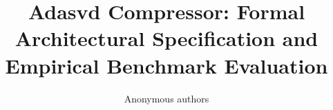 \title{\textbf{Adasvd Compressor: Formal Architectural Specification and Empirical Benchmark Evaluation}}

\author{Anonymous authors}
